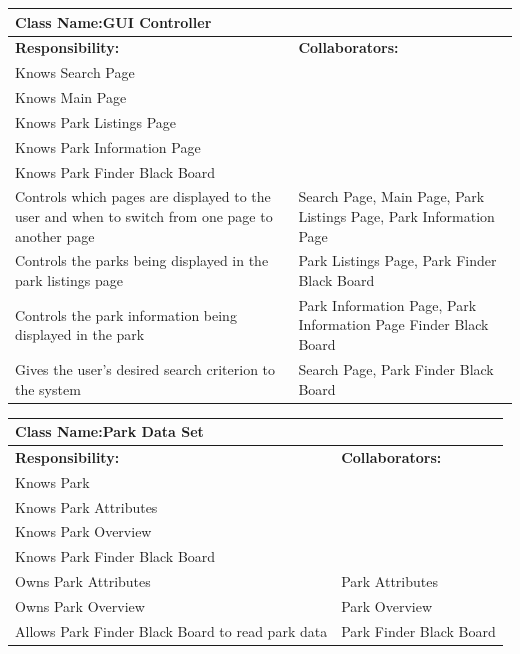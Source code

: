 \documentclass[titlepage,12pt]{article}
\begin{document}
 		\begin{table}[H]
 			\centering
 			\begin{tabular}{|p{5cm}|p{5cm}|}
 				\hline 
 				\multicolumn{2}{|l|}{\textbf{Class Name:GUI Controller}} \\
 				\hline
 				\textbf{Responsibility:} & \textbf{Collaborators:} \\
 				\hline
 				Knows Search Page & \\
 				\hline
 				Knows Main Page & \\
 				\hline
 				Knows Park Listings Page &\\
 				\hline
				Knows Park Information Page &\\
				\hline
				Knows Park Finder Black Board &\\
				\hline
				Controls which pages are displayed to the user and when to switch from one page to another page	&	Search Page, Main Page, Park Listings Page, Park Information Page\\
				\hline
				Controls the parks being displayed in the park listings page &	Park Listings Page, Park Finder Black Board \\
				\hline
				Controls the park information being displayed in the park &	Park Information Page, Park Information Page Finder Black Board 	\\
				\hline
				Gives the user’s desired search criterion to the system &	Search Page, Park Finder Black Board\\
				
 				\hline
 			\end{tabular}
 		\end{table}
 		
 		 			\begin{table}[H]
 		 				\centering
 		 				\begin{tabular}{|p{5cm}|p{5cm}|}
 		 					\hline 
 		 					\multicolumn{2}{|l|}{\textbf{Class Name:Park Data Set}} \\
 		 					\hline
 		 					\textbf{Responsibility:} & \textbf{Collaborators:} \\
 		 					\hline
	 		 				 Knows Park  & \\
	 		 				 \hline
	 		 				 Knows Park Attributes & \\
	 		 				 \hline
	 		 				 Knows Park Overview&\\
	 		 				 \hline
	 		 				 Knows Park Finder Black Board&\\
	 		 				 \hline
	 		 				 Owns Park Attributes	& Park Attributes\\
	 		 				 \hline
	 		 				 Owns Park Overview	& Park Overview\\
	 		 				 \hline
	 		 				 Allows Park Finder Black Board to read park data 	& Park Finder Black Board \\
 		 					\hline
 		 				\end{tabular}
 		 			\end{table}
 		
\end{document}
